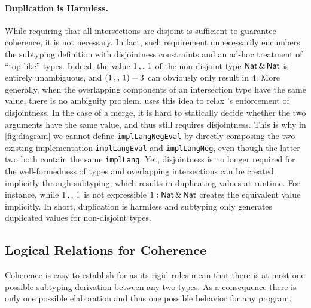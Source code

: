 \paragraph{Duplication is Harmless.}
While requiring that all intersections are disjoint is sufficient to guarantee
coherence, it is not necessary. In fact,
such requirement unnecessarily encumbers the subtyping definition with disjointness constraints
and an ad-hoc treatment of ``top-like'' types. Indeed, the value $1 \, ,, \, 1$
of the non-disjoint type $\mathsf{Nat} \,\&\, \mathsf{Nat}$ is entirely unambiguous, and
$(1 \, ,, \, 1) + 3$ can obviously only result in $4$. More generally, when the
overlapping components of an intersection type have the same value, there is no
ambiguity problem. \namee uses this idea to relax \oname's enforcement of
disjointness. In the case of a merge, it is hard to statically decide whether
the two arguments have the same value, and thus \namee still requires
disjointness. This is why in \cref{fig:diagram} we cannot define
\lstinline{implLangNegEval} by directly composing the two existing implementation
\lstinline{implLangEval} and \lstinline{implLangNeg}, even though the latter two
both contain the same \lstinline{implLang}.
Yet, disjointness is no longer required for the well-formedness
of types and overlapping intersections can be created implicitly through
subtyping, which results in duplicating values at runtime. For instance, while
$1 \, ,, \, 1$ is not expressible
$ 1 : \mathsf{Nat} \,\&\, \mathsf{Nat}$ creates the equivalent value implicitly.
In short, duplication is harmless and subtyping only generates duplicated
values for non-disjoint types.


\subsection{Logical Relations for Coherence}

Coherence is easy to establish for \oname as its rigid rules mean that there is
at most one possible subtyping derivation between any two types.  As a
consequence there is only one possible elaboration and thus one
possible behavior for any program.

